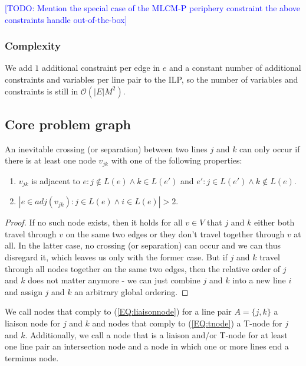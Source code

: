 \documentclass{llncs}
\newcommand\todo[1]{\textcolor{blue}{[TODO: #1]}}
\begin{document}
\todo{Mention the special case of the MLCM-P periphery constraint the above constraints handle out-of-the-box}

\subsubsection{Complexity}
We add $1$ additional constraint per edge in $e$ and a constant number of additional constraints and variables per line pair to the ILP, so the number of variables and constraints is still in $\mathcal{O}(|E|M^2)$.

%
\subsection{Core problem graph}\label{SEC:coreprobgraph}
%
An inevitable crossing (or separation) between two lines $j$ and $k$ can only occur if there is at least one node $v_{jk}$ with one of the following properties:
\begin{enumerate}
\item $v_{jk}$ is adjacent to $e : j \not\in L(e) \land k \in L(e')$ and $e' : j \in L(e') \land k \not\in L(e)$. \label{EQ:liaisonnode}
\item $|{e \in adj(v_{jk}) : j \in L(e) \land i \in L(e)}| > 2$. \label{EQ:tnode}
\end{enumerate}
\begin{proof} If no such node exists, then it holds for all $v \in V$ that $j$ and $k$ either both travel through $v$ on the same two edges or they don't travel together through $v$ at all. In the latter case, no crossing (or separation) can occur and we can thus disregard it, which leaves us only with the former case. But if $j$ and $k$ travel through all nodes together on the same two edges, then the relative order of $j$ and $k$ does not matter anymore - we can just combine $j$ and $k$ into a new line $i$ and assign $j$ and $k$ an arbitrary global ordering.
\end{proof}

We call nodes that comply to (\ref{EQ:liaisonnode}) for a line pair $A = \{j, k\}$ a liaison node for $j$ and $k$ and nodes that comply to (\ref{EQ:tnode})  a T-node for $j$ and $k$. Additionally, we call a node that is a liaison and/or T-node for at least one line pair an intersection node and a node in which one or more lines end a terminus node.
\end{document}
